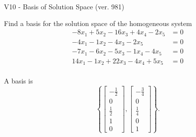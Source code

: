 \begin{exercise}
  \begin{exerciseTitle}V10 - Basis of Solution Space (ver. 981)\end{exerciseTitle}
  \begin{exerciseStatement}
    Find a basis for the solution space of the homogeneous system 
\begin{align*}
 -8 x_ 1 + 5 x_ 2 -16 x_ 3 + 4 x_ 4 -2 x_ 5 &= 0  \\ 
  -4 x_ 1 -1 x_ 2 -4 x_ 3 -2 x_ 5 &= 0  \\ 
  -7 x_ 1 -6 x_ 2 -5 x_ 3 -1 x_ 4 -4 x_ 5 &= 0  \\ 
  14 x_ 1 -1 x_ 2 + 22 x_ 3 -4 x_ 4 + 5 x_ 5 &= 0  \\ 
 \end{align*}


 
  \end{exerciseStatement}

  \begin{exerciseAnswer}
   A basis is   
\[\left\{\left[\begin{array}{c}
-\frac{1}{2} \\
0 \\
\frac{1}{2} \\
1 \\
0
\end{array}\right] , \left[\begin{array}{c}
-\frac{3}{4} \\
0 \\
\frac{1}{4} \\
0 \\
1
\end{array}\right]\right\}.\]

  


  \end{exerciseAnswer}
\end{exercise}